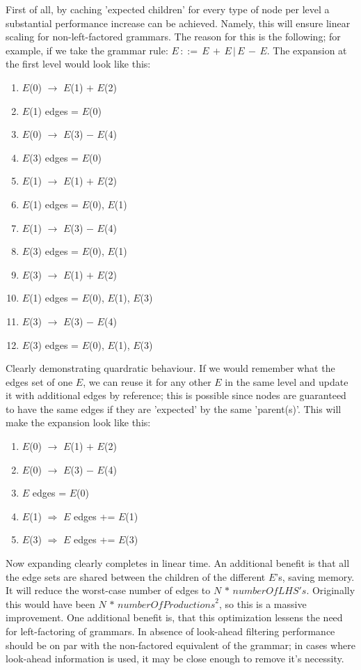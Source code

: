 \documentclass[a4paper,10pt]{article}
\begin{document}
First of all, by caching 'expected children' for every type of node per level a substantial performance increase can be achieved. Namely, this will ensure linear scaling for non-left-factored grammars. The reason for this is the following; for example, if we take the grammar rule: $E\,::=\,E\,+\,E\,|\,E\,-\,E$. The expansion at the first level would look like this:
\begin{enumerate}
 \setlength{\itemsep}{0pt}
 \setlength{\parskip}{0pt}
 \setlength{\parsep}{0pt}
 
 \item $E$(0) $\rightarrow$ $E$(1) $+$ $E$(2)
 \item $E$(1) edges = {$E$(0)}
 \item $E$(0) $\rightarrow$ $E$(3) $-$ $E$(4)
 \item $E$(3) edges = {$E$(0)}
 \item $E$(1) $\rightarrow$ $E$(1) $+$ $E$(2)
 \item $E$(1) edges = {$E$(0), $E$(1)}
 \item $E$(1) $\rightarrow$ $E$(3) $-$ $E$(4)
 \item $E$(3) edges = {$E$(0), $E$(1)}
 \item $E$(3) $\rightarrow$ $E$(1) $+$ $E$(2)
 \item $E$(1) edges = {$E$(0), $E$(1), $E$(3)}
 \item $E$(3) $\rightarrow$ $E$(3) $-$ $E$(4)
 \item $E$(3) edges = {$E$(0), $E$(1), $E$(3)}
\end{enumerate}
Clearly demonstrating quardratic behaviour. If we would remember what the edges set of one $E$, we can reuse it for any other $E$ in the same level and update it with additional edges by reference; this is possible since nodes are guaranteed to have the same edges if they are 'expected' by the same 'parent(s)'. This will make the expansion look like this:
\begin{enumerate}
 \setlength{\itemsep}{0pt}
 \setlength{\parskip}{0pt}
 \setlength{\parsep}{0pt}
 
 \item $E$(0) $\rightarrow$ $E$(1) $+$ $E$(2)
 \item $E$(0) $\rightarrow$ $E$(3) $-$ $E$(4)
 \item $E$ edges = {$E$(0)}
 \item $E$(1) $\Rightarrow$ $E$ edges += $E$(1)
 \item $E$(3) $\Rightarrow$ $E$ edges += $E$(3)
\end{enumerate}
Now expanding clearly completes in linear time. An additional benefit is that all the edge sets are shared between the children of the different $E$'s, saving memory. It will reduce the worst-case number of edges to $N\,*\,\mathit{numberOfLHS's}$. Originally this would have been $N\,*\,\mathit{numberOfProductions}^{2}$, so this is a massive improvement. One additional benefit is, that this optimization lessens the need for left-factoring of grammars. In absence of look-ahead filtering performance should be on par with the non-factored equivalent of the grammar; in cases where look-ahead information is used, it may be close enough to remove it's necessity.
\end{document}
